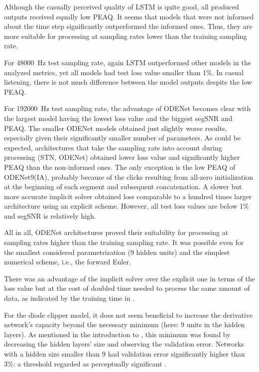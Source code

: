 Although the casually perceived quality of \ac{LSTM} is quite good, all produced outputs received equally low \ac{PEAQ}. It seems that models that were not informed about the time step significantly outperformed the informed ones. Thus, they are more suitable for processing at sampling rates lower than the training sampling rate.

For \SI{48000}{Hz} test sampling rate, again \ac{LSTM} outperformed other models in the analyzed metrics, yet all models had test loss value smaller than 1\%. In casual listening, there is not much difference between the model outputs despite the low \ac{PEAQ}.

For \SI{192000}{Hz} test sampling rate, the advantage of ODENet becomes clear with the largest model having the lowest loss value and the biggest \ac{segSNR} and \ac{PEAQ}. The smaller ODENet models obtained just slightly worse results, especially given their significantly smaller number of parameters. As could be expected, architectures that take the sampling rate into account during processing (\ac{STN}, ODENet) obtained lower loss value and significantly higher \ac{PEAQ} than the non-informed ones. The only exception is the low \ac{PEAQ} of ODENet9(IA), probably because of the clicks resulting from all-zero initialization at the beginning of each segment and subsequent concatenation. A slower but more accurate implicit solver obtained loss comparable to a hundred times larger architecture using an explicit scheme. However, all test loss values are below 1\% and \ac{segSNR} is relatively high.

All in all, ODENet architectures proved their suitability for processing at sampling rates higher than the training sampling rate. It was possible even for the smallest considered parametrization (9 hidden units) and the simplest numerical scheme, i.e., the forward Euler. 

There was an advantage of the implicit solver over the explicit one in terms of the loss value but at the cost of doubled time needed to process the same amount of data, as indicated by the training time in . 

For the diode clipper model, it does not seem beneficial to increase the derivative network's capacity beyond the necessary minimum (here: 9 units in the hidden layers). As mentioned in the introduction to , this minimum was found by decreasing the hidden layers' size and observing the validation error. Networks with a hidden size smaller than 9 had validation error significantly higher than 3\%: a threshold regarded as perceptually significant \cite{Wright2020}.

